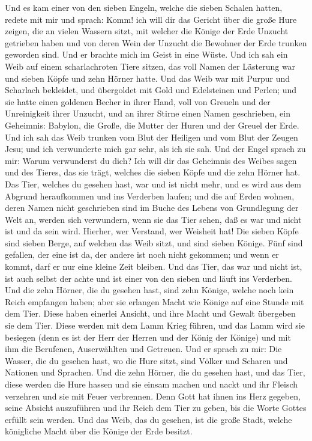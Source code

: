 Und es kam einer von den sieben Engeln, welche die sieben
Schalen hatten, redete mit mir und sprach: Komm! ich will dir das
Gericht über die große Hure zeigen, die an vielen Wassern sitzt,
 mit welcher die Könige der Erde Unzucht getrieben haben
und von deren Wein der Unzucht die Bewohner der Erde trunken geworden
sind.  Und er brachte mich im Geist in eine Wüste. Und ich
sah ein Weib auf einem scharlachroten Tiere sitzen, das voll Namen der
Lästerung war und sieben Köpfe und zehn Hörner hatte.  Und
das Weib war mit Purpur und Scharlach bekleidet, und übergoldet mit Gold
und Edelsteinen und Perlen; und sie hatte einen goldenen Becher in ihrer
Hand, voll von Greueln und der Unreinigkeit ihrer Unzucht,
 und an ihrer Stirne einen Namen geschrieben, ein
Geheimnis: Babylon, die Große, die Mutter der Huren und der Greuel der
Erde.  Und ich sah das Weib trunken vom Blut der Heiligen
und vom Blut der Zeugen Jesu; und ich verwunderte mich gar sehr, als ich
sie sah.  Und der Engel sprach zu mir: Warum verwunderst
du dich? Ich will dir das Geheimnis des Weibes sagen und des Tieres, das
sie trägt, welches die sieben Köpfe und die zehn Hörner hat.
 Das Tier, welches du gesehen hast, war und ist nicht
mehr, und es wird aus dem Abgrund heraufkommen und ins Verderben laufen;
und die auf Erden wohnen, deren Namen nicht geschrieben sind im Buche
des Lebens von Grundlegung der Welt an, werden sich verwundern, wenn sie
das Tier sehen, daß es war und nicht ist und da sein wird.
 Hierher, wer Verstand, wer Weisheit hat! Die sieben Köpfe
sind sieben Berge, auf welchen das Weib sitzt,  und sind
sieben Könige. Fünf sind gefallen, der eine ist da, der andere ist noch
nicht gekommen; und wenn er kommt, darf er nur eine kleine Zeit bleiben.
 Und das Tier, das war und nicht ist, ist auch selbst der
achte und ist einer von den sieben und läuft ins Verderben.
 Und die zehn Hörner, die du gesehen hast, sind zehn
Könige, welche noch kein Reich empfangen haben; aber sie erlangen Macht
wie Könige auf eine Stunde mit dem Tier.  Diese haben
einerlei Ansicht, und ihre Macht und Gewalt übergeben sie dem Tier.
 Diese werden mit dem Lamm Krieg führen, und das Lamm
wird sie besiegen (denn es ist der Herr der Herren und der König der
Könige) und mit ihm die Berufenen, Auserwählten und Getreuen.
 Und er sprach zu mir: Die Wasser, die du gesehen hast,
wo die Hure sitzt, sind Völker und Scharen und Nationen und Sprachen.
 Und die zehn Hörner, die du gesehen hast, und das Tier,
diese werden die Hure hassen und sie einsam machen und nackt und ihr
Fleisch verzehren und sie mit Feuer verbrennen.  Denn
Gott hat ihnen ins Herz gegeben, seine Absicht auszuführen und ihr Reich
dem Tier zu geben, bis die Worte Gottes erfüllt sein werden.
 Und das Weib, das du gesehen, ist die große Stadt,
welche königliche Macht über die Könige der Erde besitzt.

